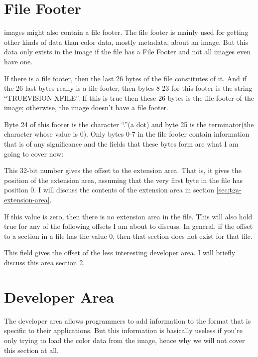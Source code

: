 \section{File Footer}

\tga images might also contain a file footer. The file footer is mainly
used for getting other kinds of data than color data, mostly metadata,
about an image. But this data only exists in the image if the file has
a File Footer and not all \tga images even have one.

If there is a file footer, then the last 26 bytes of the file
constitutes of it. And if the 26 last bytes really is a file footer,
then bytes 8-23 for this footer is the \ascii string
``TRUEVISION-XFILE''. If this is true then these 26 bytes is the file
footer of the image; otherwise, the image doesn't have a file footer.

Byte 24 of this footer is the \ascii character ``.''(a dot) and byte 25
is the \null terminator(the \ascii character whose \ascii value is
0). Only bytes 0-7 in the file footer contain information that is of
any significance and the fields that these bytes form are what I am
going to cover now:


This 32-bit number gives the offset to the extension area. That is, it
gives the position of the extension area, assuming that the very first
byte in the file has position 0. I will discuss the contents of the
extension area in section \ref{sec:tga-extension-area}.

If this value is zero, then there is no extension area in the
file. This will also hold true for any of the following offsets I am
about to discuss. In general, if the offset to a section in a file has
the value $0$, then that section does not exist for that file.


This field gives the offset of the less interesting developer area. I
will briefly discuss this area section \ref{sec:developer-area}.

\section{Developer Area}
\label{sec:developer-area}

The developer area allows programmers to add information to the \tga
format that is specific to their applications. But this information is
basically useless if you're only trying to load the color data from
the \tga image, hence why we will not cover this section at all.

